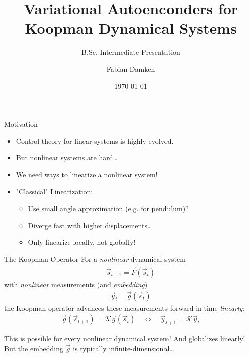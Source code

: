 \documentclass[
	aspectratio=43,
	color={accentcolor=1c},
	logo=false,
	colorframetitle=true,
]{tudabeamer}
\title{Variational Autoenconders for Koopman Dynamical Systems}
\subtitle{B.Sc. Intermediate Presentation}
\author{Fabian Damken}
\institute{Intelligent Autonomous Systems}
\date{\today}
\begin{document}
	\maketitle

	\begin{frame}{Motivation}
		\begin{itemize}
			\item Control theory for linear systems is highly evolved.
			\item But nonlinear systems are hard\dots
			\item We need ways to linearize a nonlinear system!
			\item "Classical" Linearization:
				\begin{itemize}
					\item Use small angle approximation (e.g. for pendulum)?
					\item Diverge fast with higher displacements\dots
					\item Only linearize locally, not globally!
				\end{itemize}
		\end{itemize}
	\end{frame}

	\begin{frame}{The Koopman Operator}
		For a \emph{nonlinear} dynamical system
		\begin{align*}
			\vec{s}_{t + 1} = \vec{F}(\vec{s}_{t})
		\end{align*}
		with \emph{nonlinear} measurements (and \emph{embedding})
		\begin{align*}
			\vec{y}_t = \vec{g}(\vec{s}_t)
		\end{align*}
		the Koopman operator advances these measurements forward in time \emph{linearly}:
		\begin{align*}
			\vec{g}(\vec{s}_{t + 1}) = \mathcal{K} \vec{g}(\vec{s}_t)
			\quad\iff\quad
			\vec{y}_{t + 1} = \mathcal{K} \vec{y}_t
		\end{align*}

		This is possible for every nonlinear dynamical system! And globalizes linearly! But the embedding \(\vec{g}\) is typically infinite-dimensional\dots
	\end{frame}
\end{document}
